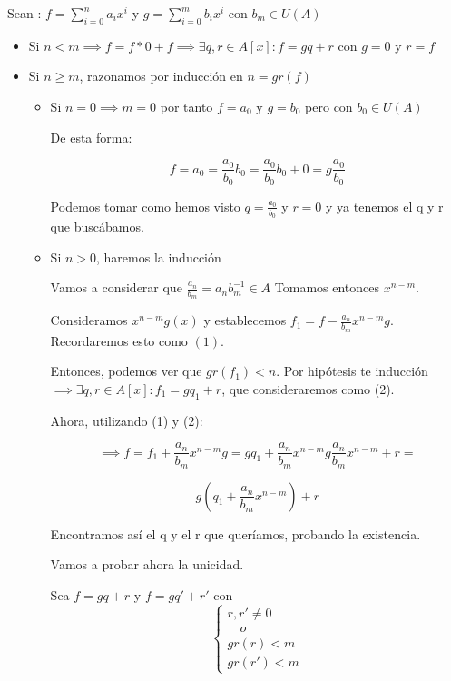 \documentclass[11pt, a4paper, titlepage]{article}
\makeatletter
\renewenvironment{proof}[1][\proofname] {\vspace{-15pt}\par\pushQED{\qed}\normalfont\topsep6\p@\@plus6\p@\relax\trivlist\item[\hskip\labelsep\it#1\@addpunct{.}]\ignorespaces}{\popQED\endtrivlist\@endpefalse}
\theoremstyle{theorem-style}
\theoremstyle{definition-style}
\theoremstyle{remark-style}
\theoremstyle{example-style}
\makeatother
\begin{document}
\newpage
\begin{proof}
	
	Sean : $f = \sum_{i=0}^n a_i x^i$ y $g = \sum_{i=0}^m b_i x^i$ con $b_m \in U(A)$
	
	\begin{itemize}
	
	\item Si $n< m \implies f = f * 0 + f \implies \exists q,r\in A[x] : f = gq+r$ con $g=0$ y $r = f$
	
	\item Si $n\geq m$, razonamos por inducción en $n=gr(f)$
	\begin{itemize}
	
	\item Si $n=0 \implies m = 0$ por tanto $f=a_0$ y $g=b_0$ pero con $b_0 \in U(A)$
	
	De esta forma:
	
	\[
	f = a_0 = \frac{a_0}{b_0}b_0 = \frac{a_0}{b_0}b_0 + 0 = g\frac{a_0}{b_0}
	\]
	
	Podemos tomar como hemos visto $q=\frac{a_0}{b_0}$ y $r=0$ y ya tenemos el q y r que buscábamos.
	
	\item Si $n> 0$, haremos la inducción
	
	Vamos a considerar que $\frac{a_n}{b_m} = a_n b_m^{-1} \in A$ Tomamos entonces $x^{n-m}$.
	
	Consideramos $x^{n-m}g(x)$ y establecemos $f_1 = f - \frac{a_n}{b_m}x^{n-m}g$. Recordaremos esto como $(1)$.
	
	Entonces, podemos ver que $gr(f_1) < n$. Por hipótesis te inducción $\implies \exists q,r \in A[x] : f_1 = gq_1 + r$, que consideraremos como (2).
	
	Ahora, utilizando (1) y (2):
	
	 \[
	 \implies f = f_1 +\frac{a_n}{b_m}x^{n-m}g = gq_1 + \frac{a_n}{b_m}x^{n-m}g\frac{a_n}{b_m}x^{n-m} +r = 
	 \]
	 
	 \[
	 g(q_1 + \frac{a_n}{b_m}x^{n-m}) + r
	 \]
	
	Encontramos así el q y el r que queríamos, probando la existencia.
	
	Vamos a probar ahora la unicidad.
	
	Sea $f=gq+r$ y $f= gq' +r'$ con
	\[
    \begin{cases}
		 r,r' \neq 0\\
		  \quad o \\
 gr(r) < m 
 \\ gr(r') < m
		   

\end{cases}\]
\end{itemize}
\end{itemize}
\end{proof}
\end{document}
